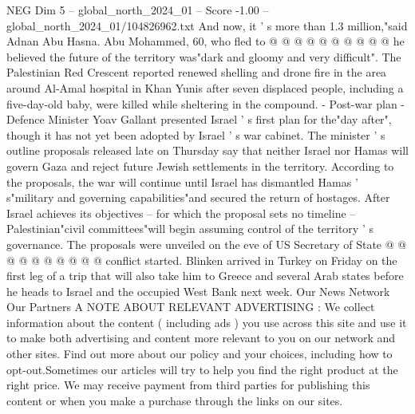 \begin{textsample}{NEG Dim 5 – global\_north\_2024\_01 – Score -1.00 – global\_north\_2024\_01/104826962.txt}
And now, it ' s more than 1.3 million,"said Adnan Abu Hasna.
Abu Mohammed, 60, who fled to @ @ @ @ @ @ @ @ @ @ he believed the future of the territory was"dark and gloomy and very difficult".
The Palestinian Red Crescent reported renewed shelling and drone fire in the area around Al-Amal hospital in Khan Yunis after seven displaced people, including a five-day-old baby, were killed while sheltering in the compound. - Post-war plan - Defence Minister Yoav Gallant presented Israel ' s first plan for the"day after", though it has not yet been adopted by Israel ' s war cabinet.
The minister ' s outline proposals released late on Thursday say that neither Israel nor Hamas will govern Gaza and reject future Jewish settlements in the territory.
According to the proposals, the war will continue until Israel has dismantled Hamas ' s"military and governing capabilities"and secured the return of hostages.
After Israel achieves its objectives -- for which the proposal sets no timeline -- Palestinian"civil committees"will begin assuming control of the territory ' s governance.
The proposals were unveiled on the eve of US Secretary of State @ @ @ @ @ @ @ @ @ @ conflict started.
Blinken arrived in Turkey on Friday on the first leg of a trip that will also take him to Greece and several Arab states before he heads to Israel and the occupied West Bank next week.
Our News Network Our Partners A NOTE ABOUT RELEVANT ADVERTISING : We collect information about the content ( including ads ) you use across this site and use it to make both advertising and content more relevant to you on our network and other sites.
Find out more about our policy and your choices, including how to opt-out.Sometimes our articles will try to help you find the right product at the right price.
We may receive payment from third parties for publishing this content or when you make a purchase through the links on our sites.

\end{textsample}
